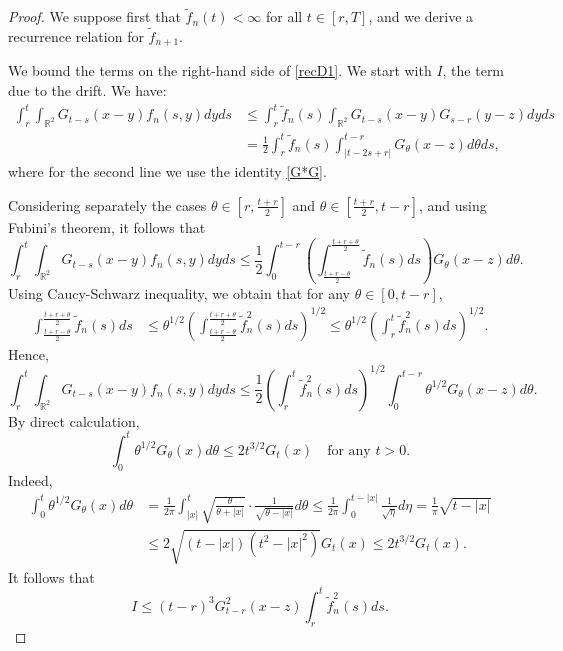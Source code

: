 \documentclass[12pt]{article}
\def\bR{\mathbb{R}}
\begin{document}
\begin{proof}
We suppose first that $\widetilde{f}_n(t)<\infty$ for all $t \in [r,T]$, and we derive a recurrence relation for $\widetilde{f}_{n+1}$. 

We bound the terms on the right-hand side of \eqref{recD1}. We start with $I$, the term due to the drift. We have:
\begin{align*}
\int_r^t \int_{\bR^2} G_{t-s}(x-y) f_n(s,y)dyds & \leq \int_r^t \widetilde{f}_n(s) \int_{\bR^2} G_{t-s}(x-y) G_{s-r}(y-z) dy ds \\
& = \frac{1}{2}\int_r^t  \widetilde{f}_n(s) \int_{|t-2s+r|}^{t-r} G_{\theta}(x-z)d\theta ds,
\end{align*}
where for the second line we use the  identity \eqref{G*G}.


Considering separately the cases $\theta \in [r,\frac{t+r}{2}]$ and $\theta \in [\frac{t+r}{2},t-r]$, and using Fubini's theorem, it follows that
\[
\int_r^t \int_{\bR^2} G_{t-s}(x-y) f_n(s,y)dyds \leq \frac{1}{2} \int_0^{t-r} \left(\int_{\frac{t+r-\theta}{2}}^{\frac{t+r+\theta}{2}} \widetilde{f}_n(s) ds \right) G_{\theta}(x-z)d\theta.
\]
Using Caucy-Schwarz inequality, we obtain that for any $\theta \in [0,t-r]$,
\begin{align*}
\int_{\frac{t+r-\theta}{2}}^{\frac{t+r+\theta}{2}} \widetilde{f}_n(s) ds  & \leq \theta^{1/2}
\left(\int_{\frac{t+r-\theta}{2}}^{\frac{t+r+\theta}{2}} \widetilde{f}_n^2(s) ds\right)^{1/2} \leq
\theta^{1/2}
\left(\int_{r}^{t} \widetilde{f}_n^2(s) ds\right)^{1/2}.
\end{align*}
Hence,
\[
\int_r^t \int_{\bR^2} G_{t-s}(x-y) f_n(s,y)dyds \leq \frac{1}{2} \left(\int_{r}^{t} \widetilde{f}_n^2(s) ds\right)^{1/2}\int_0^{t-r} \theta^{1/2} G_{\theta}(x-z)d\theta.
\]
By direct calculation,
\begin{equation}
\label{theta-G}
\int_0^t \theta^{1/2} G_{\theta}(x) d\theta \leq 2t^{3/2} G_{t}(x) \quad \mbox{for any $t>0$}.
\end{equation}
Indeed,
\begin{align*}
\int_0^t \theta^{1/2} G_{\theta}(x) d\theta &=\frac{1}{2\pi}\int_{|x|}^t \sqrt{\frac{\theta}{\theta+|x|}} \cdot \frac{1}{\sqrt{\theta-|x|}} d\theta \leq \frac{1}{2\pi} \int_{0}^{t-|x|} \frac{1}{\sqrt{\eta}} d\eta=\frac{1}{\pi}\sqrt{t-|x|} \\
& \leq 2 \sqrt{(t-|x|)(t^2-|x|^2)} G_t(x) \leq 2t^{3/2} G_{t}(x).
\end{align*}
It follows that
\begin{equation}
\label{bound-I}
I \leq   (t-r)^{3} G_{t-r}^2(x-z) \int_{r}^{t} \widetilde{f}_n^2(s) ds.
\end{equation}


\end{proof}
\end{document}
